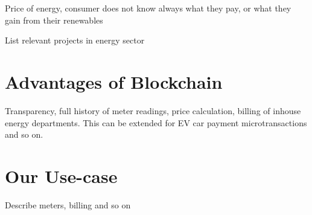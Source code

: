 Price of energy, consumer does not know always what they pay, or what they gain from their renewables

List relevant projects in energy sector


\section{Advantages of Blockchain}
Transparency, full history of meter readings, price calculation, billing of inhouse energy departments. This can be extended for EV car payment microtransactions and so on.


\section{Our Use-case}
Describe meters, billing and so on